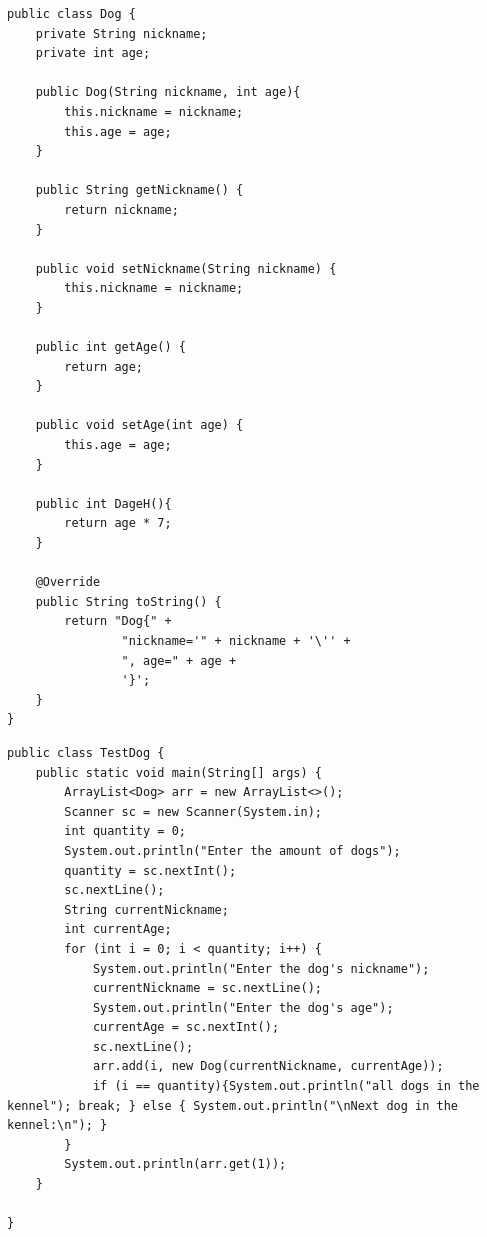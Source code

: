 \documentclass[14pt, a4paper]{extarticle}
\newenvironment{code}{\captionsetup{type=listing}}{}
\begin{document}
\begin{code}
\begin{Verbatim}[frame=single, fontsize=\footnotesize]
public class Dog {
    private String nickname;
    private int age;

    public Dog(String nickname, int age){
        this.nickname = nickname;
        this.age = age;
    }

    public String getNickname() {
        return nickname;
    }

    public void setNickname(String nickname) {
        this.nickname = nickname;
    }

    public int getAge() {
        return age;
    }

    public void setAge(int age) {
        this.age = age;
    }

    public int DageH(){
        return age * 7;
    }

    @Override
    public String toString() {
        return "Dog{" +
                "nickname='" + nickname + '\'' +
                ", age=" + age +
                '}';
    }
}
\end{Verbatim}
\end{code}
\begin{code}
\begin{Verbatim}[frame=single, fontsize=\footnotesize]
public class TestDog {
    public static void main(String[] args) {
        ArrayList<Dog> arr = new ArrayList<>();
        Scanner sc = new Scanner(System.in);
        int quantity = 0;
        System.out.println("Enter the amount of dogs");
        quantity = sc.nextInt();
        sc.nextLine();
        String currentNickname;
        int currentAge;
        for (int i = 0; i < quantity; i++) {
            System.out.println("Enter the dog's nickname");
            currentNickname = sc.nextLine();
            System.out.println("Enter the dog's age");
            currentAge = sc.nextInt();
            sc.nextLine();
            arr.add(i, new Dog(currentNickname, currentAge));
            if (i == quantity){System.out.println("all dogs in the kennel"); break; } else { System.out.println("\nNext dog in the kennel:\n"); }
        }
        System.out.println(arr.get(1));
    }

}
\end{Verbatim}
\end{code}
\end{document}
